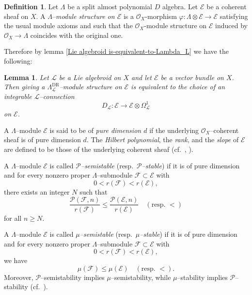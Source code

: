 \documentclass[12pt,reqno]{amsart}
\numberwithin{equation}{subsection}
\newtheorem{lem}[equation]{Lemma}
\theoremstyle{definition}
\newtheorem{defn}[equation]{Definition}
\theoremstyle{theorem}
\begin{document}
\begin{defn}
Let $\Lambda$ be a split almost polynomial $D$ algebra. Let $\mathcal{E}$ be a coherent sheaf on $X$. A $\Lambda$--\textit{module structure on $\mathcal{E}$} is a $\mathcal{O}_{X}$-morphism $\varphi : \Lambda \otimes \mathcal{E} \rightarrow \mathcal{E}$ satisfying the usual module axioms and such that the $\mathcal{O}_{X}$-module structure
on $\mathcal{E}$ induced by $\mathcal{O}_{X} \rightarrow \Lambda$ coincides with the original one.
\end{defn}

Therefore by lemma \eqref{Lie algebroid is-equivalent-to-Lambda_L} we have the following:
\begin{lem}\label{Lambda_L module is equvalent to $L$-connection }\cite[\S\,2, lemma 2.13]{CT.Simpson-1994}
	Let $\mathcal{L}$ be a Lie algebroid on $X$ and let $\mathcal{E}$ be a vector bundle on $X$.
	Then giving a $\Lambda^{\text{DR}}_{\mathcal{L}}$--module structure on $\mathcal{E}$ is equivalent to the choice of an integrable $\mathcal{L}$--connection
	\[
	D_{\mathcal{L}}:\mathcal{E}\longrightarrow \mathcal{E}\otimes \Omega^{1}_{\mathcal{L}}
	\]
	on $\mathcal{E}$.
\end{lem}

A $\Lambda$--module $\mathcal{E}$ is said to be of \emph{pure dimension $d$} if the underlying $\mathcal{O}_{X}$--coherent sheaf is of pure dimension $d$. 
The \emph{Hilbert polynomial}, the \emph{rank}, and the \emph{slope} of $\mathcal{E}$ are defined to be those of the underlying coherent sheaf (cf.~\cite[\S\,1]{CT.Simpson-1994}, \cite[Ch.~1]{Huybrechts-Lehn-2010}).

A $\Lambda$--module $\mathcal{E}$ is called \emph{$\mathcal{P}$--semistable} (resp.~\emph{$\mathcal{P}$--stable}) if it is of pure dimension and for every nonzero proper $\Lambda$--submodule
$\mathscr{F}\subset \mathcal{E}$ with
\[
0 < r(\mathscr{F}) < r(\mathcal{E}),
\]
there exists an integer $N$ such that
\[
\frac{\mathcal{P}(\mathscr{F},n)}{r(\mathscr{F})}
\leqslant
\frac{\mathcal{P}(\mathcal{E},n)}{r(\mathcal{E})}
\quad
(\text{resp. } <)
\]
for all $n \geqslant N$.

A $\Lambda$--module $\mathcal{E}$ is called \emph{$\mu$--semistable} (resp.~\emph{$\mu$--stable}) if it is of pure dimension and for every nonzero proper $\Lambda$--submodule
$\mathscr{F}\subset \mathcal{E}$ with
\[
0 < r(\mathscr{F}) < r(\mathcal{E}),
\]
we have
\[
\mu(\mathscr{F}) \leqslant \mu(\mathcal{E})
\quad
(\text{resp. } <).
\]
Moreover, $\mathcal{P}$--semistability implies $\mu$--semistability, while $\mu$--stability implies $\mathcal{P}$--stability (cf.~\cite[\S\,1]{CT.Simpson-1994}).
\end{document}
